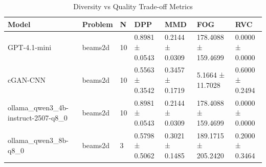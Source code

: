 \begin{table}
\caption{Diversity vs Quality Trade-off Metrics}
\label{tab:diversity_quality}
\begin{tabular}{lllllll}
\toprule
Model & Problem & N & DPP & MMD & FOG & RVC \\
\midrule
GPT-4.1-mini & beams2d & 10 & 0.8981 ± 0.0543 & 0.2144 ± 0.0309 & 178.4088 ± 159.4699 & 0.0000 ± 0.0000 \\
cGAN-CNN & beams2d & 10 & 0.5563 ± 0.3542 & 0.3457 ± 0.1719 & 5.1664 ± 11.7028 & 0.6000 ± 0.2494 \\
ollama_qwen3_4b-instruct-2507-q8_0 & beams2d & 10 & 0.8981 ± 0.0543 & 0.2144 ± 0.0309 & 178.4088 ± 159.4699 & 0.0000 ± 0.0000 \\
ollama_qwen3_8b-q8_0 & beams2d & 3 & 0.5798 ± 0.5062 & 0.3021 ± 0.1485 & 189.1715 ± 205.2420 & 0.2000 ± 0.3464 \\
\bottomrule
\end{tabular}
\end{table}
